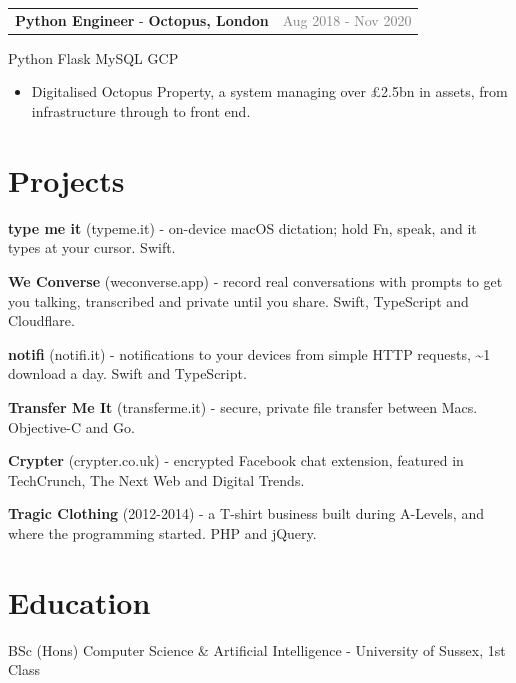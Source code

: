 \documentclass[10pt,a4paper]{extarticle}
\makeatletter
\newcommand{\role}[3]{%
  \vspace{3pt}\noindent\begin{tabularx}{\textwidth}{@{}Xr@{}}
  \textbf{#1} - \textbf{#2} & \textcolor{grey}{\small #3}
  \end{tabularx}\par}
\newcommand{\stack}[1]{{\footnotesize\color{accent}#1}\par\vspace{1pt}}
\makeatother
\begin{document}
\role{Python Engineer}{Octopus, London}{Aug 2018 - Nov 2020}
\stack{Python \textcolor{black}{\textbar{}} Flask \textcolor{black}{\textbar{}} MySQL \textcolor{black}{\textbar{}} GCP}
\begin{itemize}
\item Digitalised Octopus Property, a system managing over \pounds2.5bn in assets, from infrastructure through to front end.
\end{itemize}

\section{Projects}
\vspace{2pt}
\textbf{type me it} (typeme.it) - on-device macOS dictation; hold Fn, speak, and it types at your cursor. Swift.\par
\textbf{We Converse} (weconverse.app) - record real conversations with prompts to get you talking, transcribed and private until you share. Swift, TypeScript and Cloudflare.\par
\textbf{notifi} (notifi.it) - notifications to your devices from simple HTTP requests, \textasciitilde1 download a day. Swift and TypeScript.\par
\textbf{Transfer Me It} (transferme.it) - secure, private file transfer between Macs. Objective-C and Go.\par
\textbf{Crypter} (crypter.co.uk) - encrypted Facebook chat extension, featured in TechCrunch, The Next Web and Digital Trends.\par
\textbf{Tragic Clothing} (2012-2014) - a T-shirt business built during A-Levels, and where the programming started. PHP and jQuery.\par

\section{Education}
\vspace{2pt}
BSc (Hons) Computer Science \& Artificial Intelligence - University of Sussex, 1st Class\par
\end{document}

